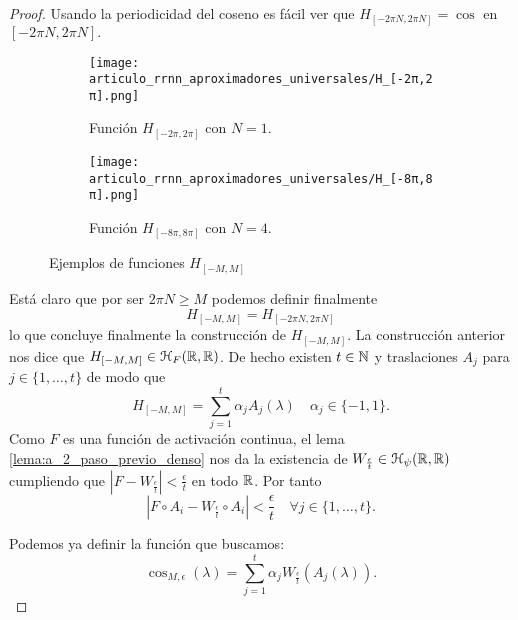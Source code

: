 \begin{proof}
    Usando la periodicidad del coseno es fácil ver que 
    $H_{[-2\pi N, 2 \pi N]} = \cos$ en $[-2\pi N, 2 \pi N].$
      \begin{figure}[h]
        \centering
        \begin{subfigure}[b]{0.45\textwidth}
            \centering
            \texttt{[image: articulo\_rrnn\_aproximadores\_universales/H\_[-2π,2π].png]}
            \caption{Función $H_{[-2\pi, 2\pi]}$ con $N=1$.}
            \label{fig:H_con_M}
        \end{subfigure}
        \hfill
        \begin{subfigure}[b]{0.45\textwidth}
            \centering
            \texttt{[image: articulo\_rrnn\_aproximadores\_universales/H\_[-8π,8π].png]}
            \caption{Función $H_{[-8\pi, 8\pi]}$ con $N=4$. }
        \end{subfigure}
        \hfill
        \caption{Ejemplos de funciones $H_{[-M, M]}$}
    \end{figure}

    Está claro que por ser $2 \pi N \geq M$ podemos definir 
    finalmente 
    \begin{equation}
        H_{[-M, M]} = H_{[-2\pi N, 2 \pi N]}
    \end{equation}
    lo que concluye finalmente la construcción de $H_{[-M, M]}.$
    La construcción anterior nos dice que 
    $H_{[-M, M]} \in \mathcal{H}_F{(\mathbb{R}, \mathbb{R})}$. 
    De hecho existen $t \in \mathbb{N}$ y traslaciones $A_j$ para 
    $j \in \{1, \ldots, t\}$ de modo que 
    \begin{equation}
        H_{[-M, M]} = \sum_{j=1}^t \alpha_j A_j(\lambda) 
        \quad 
        \alpha_j \in \{-1,1\}. 
    \end{equation}
    Como $F$ es una función de activación continua, el lema \ref{lema:a_2_paso_previo_denso}
    nos da la existencia de 
    $W_\frac{\epsilon}{t} \in \mathcal{H}_\psi{(\mathbb{R}, \mathbb{R})}$ cumpliendo que 
    $|F - W_{ \frac{\epsilon}{t}} | < \frac{\epsilon}{t}$ en todo $\mathbb{R}$.
    Por tanto 
    \begin{equation}
        |F \circ A_i - W_{ \frac{\epsilon}{t}} \circ A_i |
         < \frac{\epsilon}{t}
         \quad 
         \forall j \in \{1, \ldots, t\}
         . 
    \end{equation}

Podemos ya definir la función que buscamos: 
    \begin{equation}
        \cos_{M, \epsilon}(\lambda) = \sum_{j=1}^t 
        \alpha_j  W_{ \frac{\epsilon}{t}}(A_j(\lambda)). 
    \end{equation}


\end{proof}
